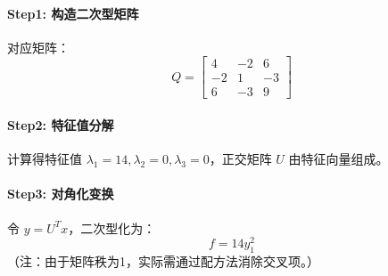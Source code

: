 \paragraph{Step1: 构造二次型矩阵}  
对应矩阵：
\[
Q = \begin{bmatrix}
4 & -2 & 6 \\
-2 & 1 & -3 \\
6 & -3 & 9
\end{bmatrix}
\]

\paragraph{Step2: 特征值分解}  
计算得特征值 \(\lambda_1 = 14, \lambda_2 = 0, \lambda_3 = 0\)，正交矩阵 \(U\) 由特征向量组成。

\paragraph{Step3: 对角化变换}  
令 \(y = U^T x\)，二次型化为：
\[
f = 14y_1^2
\]
（注：由于矩阵秩为1，实际需通过配方法消除交叉项。）